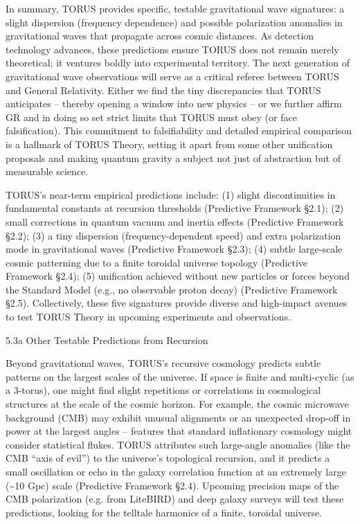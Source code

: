 \documentclass[
]{article}
\begin{document}
In summary, TORUS provides specific, testable gravitational wave
signatures: a slight dispersion (frequency dependence) and possible
polarization anomalies in gravitational waves that propagate across
cosmic distances. As detection technology advances, these predictions
ensure TORUS does not remain merely theoretical; it ventures boldly into
experimental territory. The next generation of gravitational wave
observations will serve as a critical referee between TORUS and General
Relativity. Either we find the tiny discrepancies that TORUS anticipates
-- thereby opening a window into new physics -- or we further affirm GR
and in doing so set strict limits that TORUS must obey (or face
falsification). This commitment to falsifiability and detailed empirical
comparison is a hallmark of TORUS Theory, setting it apart from some
other unification proposals and making quantum gravity a subject not
just of abstraction but of measurable science.

TORUS's near-term empirical predictions include: (1) slight
discontinuities in fundamental constants at recursion thresholds
(Predictive Framework §2.1); (2) small corrections in quantum vacuum and
inertia effects (Predictive Framework §2.2); (3) a tiny dispersion
(frequency-dependent speed) and extra polarization mode in gravitational
waves (Predictive Framework §2.3); (4) subtle large-scale cosmic
patterning due to a finite toroidal universe topology (Predictive
Framework §2.4); (5) unification achieved without new particles or
forces beyond the Standard Model (e.g., no observable proton decay)
(Predictive Framework §2.5). Collectively, these five signatures provide
diverse and high-impact avenues to test TORUS Theory in upcoming
experiments and observations.

5.3a Other Testable Predictions from Recursion

Beyond gravitational waves, TORUS's recursive cosmology predicts subtle
patterns on the largest scales of the universe. If space is finite and
multi-cyclic (as a 3-torus), one might find slight repetitions or
correlations in cosmological structures at the scale of the cosmic
horizon. For example, the cosmic microwave background (CMB) may exhibit
unusual alignments or an unexpected drop-off in power at the largest
angles -- features that standard inflationary cosmology might consider
statistical flukes. TORUS attributes such large-angle anomalies (like
the CMB ``axis of evil'') to the universe's topological recursion, and
it predicts a small oscillation or echo in the galaxy correlation
function at an extremely large (\textasciitilde10 Gpc) scale (Predictive
Framework §2.4). Upcoming precision maps of the CMB polarization (e.g.
from LiteBIRD) and deep galaxy surveys will test these predictions,
looking for the telltale harmonics of a finite, toroidal universe.
\end{document}
